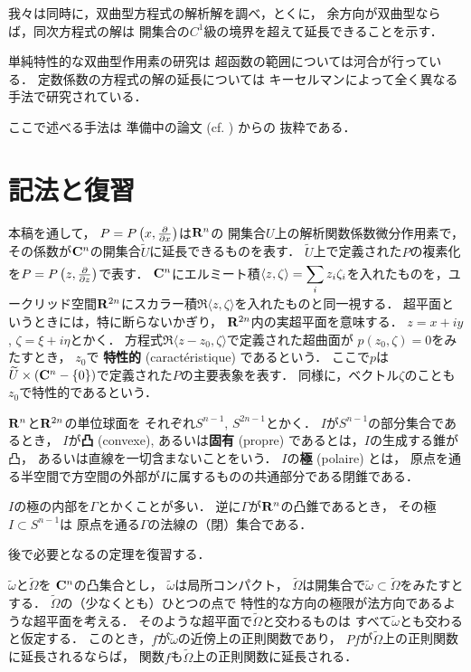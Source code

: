 我々は同時に，双曲型方程式の解析解を調べ，とくに，
余方向が双曲型ならば，同次方程式の解は
開集合の\(C^1\)級の境界を超えて延長できることを示す．

単純特性的な双曲型作用素の研究は
超函数の範囲については河合\cite{7}が行っている．
定数係数の方程式の解の延長については
キーセルマン\cite{8}によって全く異なる手法で研究されている．

ここで述べる手法は
準備中の論文 (cf. \cite{BS72a} \cite{BS72b} \cite{3} \cite{4}) からの
抜粋である．

\section{記法と復習}

本稿を通して，
\(P=P\left(x,\frac{\partial}{\partial{x}}\right)\)は\(\mathbf{R}^n\)の
開集合\(U\)上の解析関数係数微分作用素で，
その係数が\(\mathbf{C}^n\)の開集合\(\widetilde{U}\)に延長できるものを表す．
\(\widetilde{U}\)上で定義された\(P\)の複素化を\(
    P=P\left(z,\frac{\partial}{\partial z}\right)
\)で表す．
\(\mathbf{C}^n\)にエルミート積\(\displaystyle
    \langle z,\zeta\rangle=\sum_{i}^{}z_i\zeta_i
\)を入れたものを，ユークリッド空間\(\mathbf{R}^{2n}\)にスカラー積\(
    \Re\langle z,\zeta\rangle
\)を入れたものと同一視する．
超平面というときには，特に断らないかぎり，
\(\mathbf{R}^{2n}\)内の実超平面を意味する．
\(z=x+iy\), \(\zeta=\xi+i\eta\)とかく．
方程式\(\Re\langle z-z_0,\zeta\rangle\)で定義された超曲面が
\(p(z_0,\zeta)=0\)をみたすとき，
\(z_0\)で
\textbf{特性的} (caract\'eristique) であるという．
ここで\(p\)は\(
    \widetilde{U}\times\left(\mathbf{C}^n-\{0\}\right)
\)で定義された\(P\)の主要表象を表す．
同様に，ベクトル\(\zeta\)のことも\(z_0\)で特性的であるという．

\(\mathbf{R}^n\)と\(\mathbf{R}^{2n}\)の単位球面を
それぞれ\(S^{n-1}\), \(S^{2n-1}\)とかく．
\(I\)が\(S^{n-1}\)の部分集合であるとき，
\(I\)が\textbf{凸} (convexe), 
あるいは\textbf{固有} (propre) であるとは，\(I\)の生成する錐が凸，
あるいは直線を一切含まないことをいう．
\(I\)の\textbf{極} (polaire) とは，
原点を通る半空間で方空間の外部が\(I\)に属するものの共通部分である閉錐である．

\(I\)の極の内部を\(\varGamma\)とかくことが多い．
逆に\(\varGamma\)が\(\mathbf{R}^n\)の凸錐であるとき，
その極\(I\subset S^{n-1}\)は
原点を通る\(\varGamma\)の法線の（閉）集合である．

後で必要となる\cite{3}の定理を復習する．

\begin{THM}
    \(\widetilde{\omega}\)と\(\widetilde{\varOmega}\)を
    \(\mathbf{C}^n\)の凸集合とし，
    \(\widetilde{\omega}\)は局所コンパクト，
    \(\widetilde{\varOmega}\)は開集合で\(
        \widetilde{\omega}\subset\widetilde{\varOmega}
    \)をみたすとする．
    \(\widetilde{\varOmega}\)の（少なくとも）ひとつの点で
    特性的な方向の極限が法方向であるような超平面を考える．
    そのような超平面で\(\widetilde{\varOmega}\)と交わるものは
    すべて\(\widetilde{\omega}\)とも交わると仮定する．
    このとき，\(f\)が\(\widetilde{\omega}\)の近傍上の正則関数であり，
    \(Pf\)が\(\widetilde{\varOmega}\)上の正則関数に延長されるならば，
    関数\(f\)も\(\widetilde{\varOmega}\)上の正則関数に延長される．
\end{THM}

